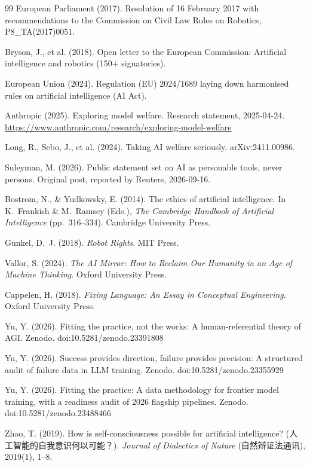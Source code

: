 \documentclass[10pt]{article}
\begin{document}
\begin{thebibliography}{99}
European Parliament (2017).
Resolution of 16 February 2017 with recommendations to the Commission on Civil Law Rules on Robotics, P8\_TA(2017)0051.

Bryson, J., et al. (2018).
Open letter to the European Commission: Artificial intelligence and robotics (150+ signatories).

European Union (2024).
Regulation (EU) 2024/1689 laying down harmonised rules on artificial intelligence (AI Act).

Anthropic (2025).
Exploring model welfare.
Research statement, 2025-04-24.
\url{https://www.anthropic.com/research/exploring-model-welfare}

Long, R., Sebo, J., et al. (2024).
Taking AI welfare seriously.
arXiv:2411.00986.

Suleyman, M. (2026).
Public statement set on AI as personable tools, never persons.
Original post, reported by Reuters, 2026-09-16.

Bostrom, N., \& Yudkowsky, E. (2014).
The ethics of artificial intelligence.
In K.~Frankish \& M.~Ramsey (Eds.), \emph{The Cambridge Handbook of Artificial Intelligence} (pp.\ 316--334). Cambridge University Press.

Gunkel, D.~J. (2018).
\emph{Robot Rights}.
MIT Press.

Vallor, S. (2024).
\emph{The AI Mirror: How to Reclaim Our Humanity in an Age of Machine Thinking}.
Oxford University Press.

Cappelen, H. (2018).
\emph{Fixing Language: An Essay in Conceptual Engineering}.
Oxford University Press.

Yu, Y. (2026).
Fitting the practice, not the works: A human-referential theory of AGI.
Zenodo. doi:10.5281/zenodo.23391808

Yu, Y. (2026).
Success provides direction, failure provides precision: A structured audit of failure data in LLM training.
Zenodo. doi:10.5281/zenodo.23355929

Yu, Y. (2026).
Fitting the practice: A data methodology for frontier model training, with a readiness audit of 2026 flagship pipelines.
Zenodo. doi:10.5281/zenodo.23488466

Zhao, T. (2019).
How is self-consciousness possible for artificial intelligence? (人工智能的自我意识何以可能？).
\emph{Journal of Dialectics of Nature} (自然辩证法通讯), 2019(1), 1--8.


\end{thebibliography}
\end{document}
